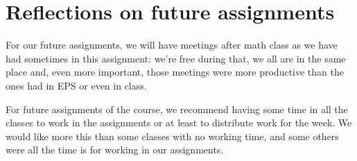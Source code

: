 \documentclass{article}
\begin{document}
\section{Reflections on future assignments}

For our future assignments, we will have meetings after math class as we have had sometimes in this assignment: we're free during that, we all are in the same place and, even more important, those meetings were more productive than the ones had in EPS or even in class.

For future assignments of the course, we recommend having some time in all the classes to work in the assignments or at least to distribute work for the week. We would like more this than some classes with no working time, and some others were all the time is for working in our assignments.
\end{document}
